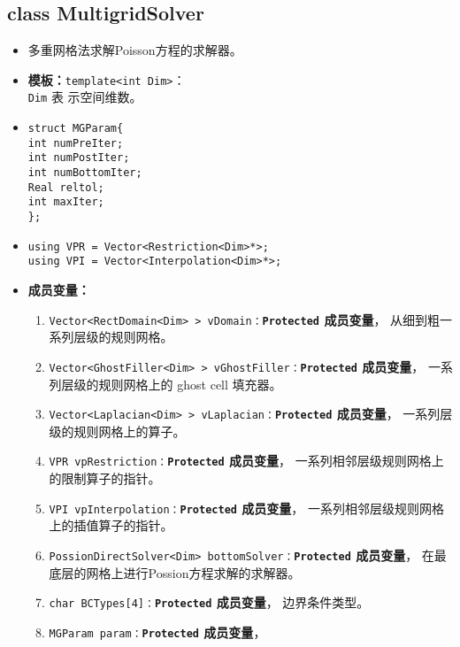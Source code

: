 \documentclass[a4paper,twoside]{ctexart}
\begin{document}
\subsection*{class MultigridSolver}
\begin{itemize}
    \item 多重网格法求解Poisson方程的求解器。
    \item \textbf{模板：}\texttt{template<int Dim>}：\\\texttt{Dim} 表
      示空间维数。
      \item \texttt{struct MGParam\{\\
            int numPreIter;\\
            int numPostIter;\\
            int numBottomIter;\\
            Real reltol;\\
            int maxIter;\\
          \};
}
    \item \texttt{using VPR = Vector<Restriction<Dim>*>;\\
        using VPI = Vector<Interpolation<Dim>*>;}
      \item \textbf{成员变量：}
        \begin{enumerate}[(1)]
        \item \texttt{Vector<RectDomain<Dim> > vDomain：}\textbf{\texttt{Protected}  成员变量}，
          从细到粗一系列层级的规则网格。
        \item \texttt{Vector<GhostFiller<Dim> > vGhostFiller：}\textbf{\texttt{Protected}  成员变量}，
          一系列层级的规则网格上的 ghost cell 填充器。
        \item \texttt{Vector<Laplacian<Dim> > vLaplacian：}\textbf{\texttt{Protected}  成员变量}，
          一系列层级的规则网格上的算子。
        \item \texttt{VPR vpRestriction：}\textbf{\texttt{Protected}  成员变量}，
          一系列相邻层级规则网格上的限制算子的指针。
        \item \texttt{VPI vpInterpolation：}\textbf{\texttt{Protected}  成员变量}，
          一系列相邻层级规则网格上的插值算子的指针。
        \item \texttt{PossionDirectSolver<Dim> bottomSolver：}\textbf{\texttt{Protected}  成员变量}，
          在最底层的网格上进行Possion方程求解的求解器。
        \item \texttt{char BCTypes[4]：}\textbf{\texttt{Protected}  成员变量}，
          边界条件类型。
        \item \texttt{MGParam param：}\textbf{\texttt{Protected}  成员变量}，

\end{enumerate}
\end{itemize}
\end{document}
